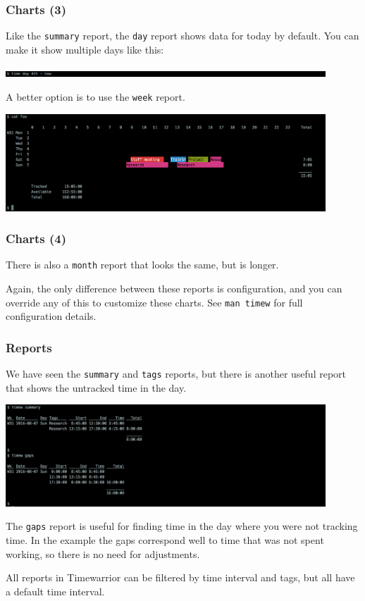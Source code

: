 \documentclass[t,handout]{beamer}
\begin{document}
\begin{frame}[fragile]\frametitle{Charts (3)}
    \vfill
    Like the \verb=summary= report, the \verb=day= report shows data for today by default. You can make it show multiple days like this:

    \includegraphics[width=12cm]{images/tutorial27.png}

    A better option is to use the \verb=week= report.

    \includegraphics[width=12cm]{images/tutorial28.png}
\end{frame}

\begin{frame}[fragile]\frametitle{Charts (4)}
    \vfill
    There is also a \verb=month= report that looks the same, but is longer.

    Again, the only difference between these reports is configuration, and you can override any of this to customize these charts. See \verb=man timew= for full configuration details.
\end{frame}

\begin{frame}[fragile]\frametitle{Reports}
    \vfill
    We have seen the \verb=summary= and \verb=tags= reports, but there is another useful report that shows the untracked time in the day.

    \includegraphics[width=12cm]{images/tutorial29.png}

    The \verb=gaps= report is useful for finding time in the day where you were not tracking time. In the example the gaps correspond well to time that was not spent working, so there is no need for adjustments.

    All reports in Timewarrior can be filtered by time interval and tags, but all have a default time interval.
\end{frame}
\end{document}
